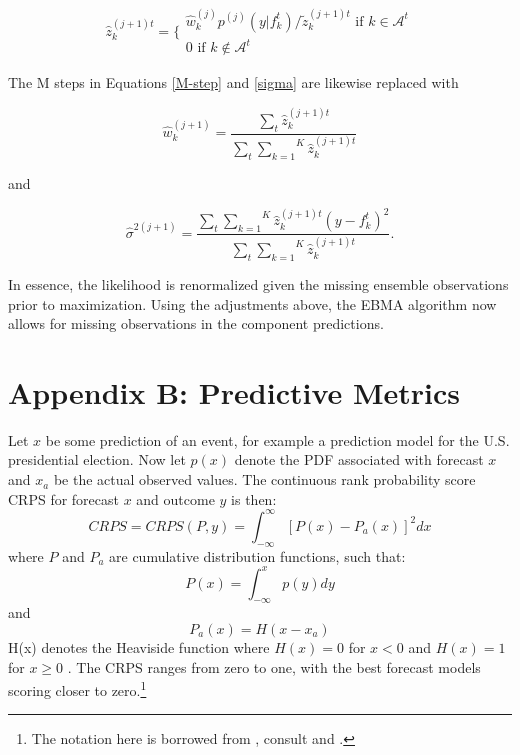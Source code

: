 \documentclass[12pt,fullpage,endnotes]{article}
\begin{document}
\begin{equation}
\hat{z}^{(j+1)t}_{k} = \Bigg\{ \begin{array}{c} {\hat{w}^{(j)}_k p^{(j)}(y|f_{k}^{t})}/{\tilde{z}_k^{(j+1)t} } \mbox{ if } k \in \mathcal{A}^t\\ 0 \mbox{ if } k \notin \mathcal{A}^t \end{array}
\end{equation}



\noindent  The M steps in Equations \ref{M-step} and \ref{sigma} are likewise replaced with

\begin{equation}
\hat{w}^{(j+1)}_k=\frac{\underset{t}{\sum}\hat{z}^{(j+1)t}_{k}}{\underset{t}{\sum}\overset{K}{\underset{k=1}{ \sum}} \hat{z}_k^{(j+1)t}}
\end{equation}


\noindent and

\begin{equation}
\hat{\sigma}^{2(j+1)}=\frac{\underset{t}{\sum}\overset{K}{\underset{k=1}{\sum}}\hat{z}^{(j+1)t}_{k}(y-f_{k}^{t})^2 }{\underset{t}{\sum}\overset{K}{\underset{k=1}{ \sum}} \hat{z}_k^{(j+1)t}}.
\end{equation}

\noindent In essence, the likelihood is renormalized given the missing
ensemble observations prior to maximization. Using the adjustments
above, the EBMA algorithm now allows for missing observations in the
component predictions.



 \section*{Appendix B: Predictive Metrics}
Let $x$ be some prediction of an event, for example a prediction model for the U.S. presidential election. Now let $p(x)$ denote the PDF associated with forecast $x$ and $x_a$ be the actual observed values. The continuous rank probability score CRPS for forecast $x$ and outcome $y$ is then:
\begin{equation}
CRPS=CRPS(P,y)=\int^{\infty}_{-\infty} [P(x)-P_a(x)]^2 dx
\end{equation}
where $P$ and $P_a$ are cumulative distribution functions, such that:
\begin{equation}
P(x)=\int^{x}_{-\infty} p(y) dy
\end{equation}
and 
\begin{equation}
P_a(x)=H(x-x_a)
\end{equation}
H(x) denotes the Heaviside function where $H(x)=0$ for $x<0$ and $H(x)=1$ for $x\geq0$ \citep{Hersbach:2000}. The CRPS ranges from zero to one, with the best forecast models scoring closer to zero.\footnote{The notation here is borrowed from \citet{Hersbach:2000}, consult \citet{Hersbach:2000} and \citet{GneitingEtAl:2007}.}
\end{document}
